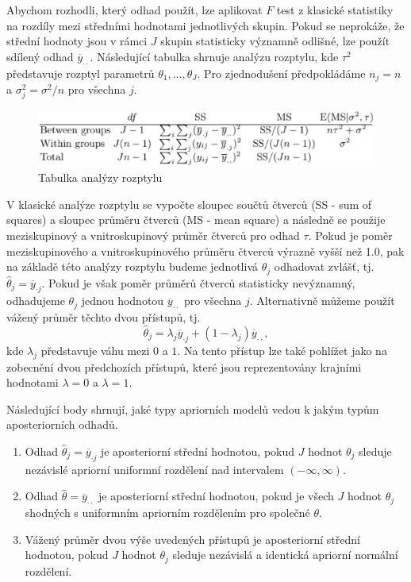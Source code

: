 Abychom rozhodli, který odhad použít, lze aplikovat $F$ test z klasické statistiky na rozdíly mezi středními hodnotami jednotlivých skupin. Pokud se neprokáže, že střední hodnoty jsou v rámci $J$ skupin statisticky významně odlišné, lze použít sdílený odhad $\overline{y}_{\cdot \cdot}$. Následující tabulka shrnuje analýzu rozptylu, kde $\tau^2$ představuje rozptyl parametrů $\theta_1, ..., \theta_J$. Pro zjednodušení předpokládáme $n_j = n$ a $\sigma_j^2 = \sigma^2 / n$ pro všechna $j$.
\begin{figure}[htp]
\centering
\includegraphics[scale = 0.45]{pictures/tbl_5_2.eps}
\caption{Tabulka analýzy rozptylu}
\label{fig_5_2}
\end{figure}
V klasické analýze rozptylu se vypočte sloupec součtů čtverců (SS - sum of squares) a sloupec průměru čtverců (MS - mean square) a následně se použije meziskupinový a vnitroskupinový průměr čtverců pro odhad $\tau$. Pokud je poměr meziskupinového a vnitroskupinového průměru čtverců výrazně vyšší než 1.0, pak na základě této analýzy rozptylu budeme jednotlivá $\theta_j$ odhadovat zvlášť, tj. $\hat{\theta}_j = \overline{y}_{\cdot j}$. Pokud je však poměr průměrů čtverců statisticky nevýznamný, odhadujeme $\theta_j$ jednou hodnotou $\overline{y}_{\cdot \cdot}$ pro všechna $j$. Alternativně můžeme použít vážený průměr těchto dvou přístupů, tj.
\begin{equation}
\hat{\theta}_j = \lambda_j \overline{y}_{\cdot j} + (1 - \lambda_j) \overline{y}_{\cdot \cdot},
\end{equation}
kde $\lambda_j$ představuje váhu mezi $0$ a $1$. Na tento přístup lze také pohlížet jako na zobecnění dvou předchozích přístupů, které jsou reprezentovány krajními hodnotami $\lambda = 0$ a $\lambda = 1$.

Následující body shrnují, jaké typy apriorních modelů vedou k jakým typům aposteriorních odhadů.
\begin{enumerate}
\item Odhad $\hat{\theta}_j = \overline{y}_{\cdot j}$ je aposteriorní střední hodnotou, pokud $J$ hodnot $\theta_j$ sleduje nezávislé apriorní uniformní rozdělení nad intervalem $(-\infty, \infty)$.
\item Odhad $\hat{\theta} = \overline{y}_{\cdot \cdot}$ je aposteriorní střední hodnotou, pokud je všech $J$ hodnot $\theta_j$ shodných s uniformním apriorním rozdělením pro společné $\theta$.
\item Vážený průměr dvou výše uvedených přístupů je aposteriorní střední hodnotou, pokud $J$ hodnot $\theta_j$ sleduje nezávislá a identická apriorní normální rozdělení.
\end{enumerate}

